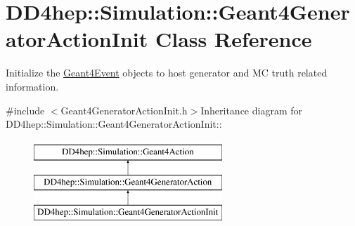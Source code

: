 \hypertarget{class_d_d4hep_1_1_simulation_1_1_geant4_generator_action_init}{
\section{DD4hep::Simulation::Geant4GeneratorActionInit Class Reference}
\label{class_d_d4hep_1_1_simulation_1_1_geant4_generator_action_init}
}


Initialize the \hyperlink{class_d_d4hep_1_1_simulation_1_1_geant4_event}{Geant4Event} objects to host generator and MC truth related information.  


{\ttfamily \#include $<$Geant4GeneratorActionInit.h$>$}Inheritance diagram for DD4hep::Simulation::Geant4GeneratorActionInit::\begin{figure}[H]
\begin{center}
\leavevmode
\includegraphics[height=3cm]{class_d_d4hep_1_1_simulation_1_1_geant4_generator_action_init}
\end{center}
\end{figure}
